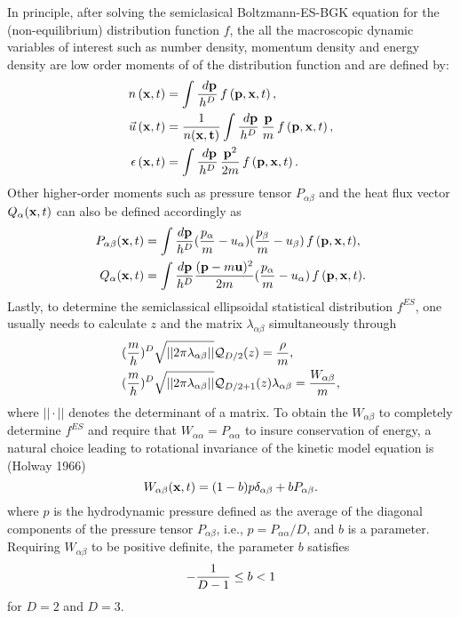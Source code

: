 \documentclass{rsproca}%
\begin{document}
In principle, after solving the semiclasical Boltzmann-ES-BGK equation for the (non-equilibrium) distribution function $f$, the all the macroscopic dynamic variables of interest such as number density, momentum density and energy density are low order moments of of the distribution function and are defined by:
\begin{subequations}
\begin{align}
n\left({\bf x},t\right) &= \int{\frac{\ d{\bf p}}{h^D}}\,f\left({\bf p},{\bf x}, t\right), \\
\vec u \left({\bf x},t\right) &= {1\over n(\bf x, t) }\int{\frac{\ d{\bf p}}{h^D}\,\frac{\bf p}{m}}\,f\left({\bf p},{\bf x}, t\right), \\
{\epsilon}\left({\bf x},t\right) &= \int{\frac{\ d{\bf p}}{h^D}\,\frac{{\bf p}^2}{2m}}\,f\left({\bf p},{\bf x}, t\right).
\end{align}
\end{subequations}
Other higher-order moments such as pressure tensor $P_{\alpha \beta}$ and the heat flux vector $Q_{\alpha}({\bf x},t)$ can also be defined accordingly as
\begin{align}
P_{\alpha \beta}({\bf x},t) &= \int{\frac{d{\bf p}}{h^D}(\frac{p_{\alpha}}{m}-u_{\alpha})(\frac{p_{\beta}}{m}-u_{\beta})\,f\,({\bf p},{\bf x},t)}, \\
Q_{\alpha}({\bf x},t) &= \int{\frac{d{\bf p}}{h^D}\frac{({\bf p}-m{\bf u})^2}{2m}(\frac{p_{\alpha}}{m}-u_{\alpha})\,f\,({\bf p},{\bf x},t)}.
\label{stressflux}
\end{align}
Lastly, to determine the semiclassical ellipsoidal statistical distribution $f^{ES}$, one usually needs to calculate $z$ and the matrix $\lambda_{\alpha \beta}$ simultaneously through
\begin{align}
&({m \over  h})^D \sqrt{ ||2 \pi \lambda_{\alpha \beta}|| } \mathcal{Q}_{D/2}(z)= {\rho \over m}, \\
&({m \over  h})^D \sqrt{ ||2 \pi \lambda_{\alpha \beta}|| } \mathcal{Q}_{D/2 +1}(z) \lambda_{\alpha \beta} = {W_{\alpha \beta} \over m},
\end{align}
where $||\cdot ||$ denotes the determinant of a matrix.   To obtain the $W_{\alpha \beta}$ to completely determine $f^{ES}$ and require that $W_{\alpha \alpha}=P_{\alpha \alpha}$ to insure conservation of energy, a natural choice leading to rotational invariance of the kinetic model equation is (Holway 1966)
\begin{equation}
W_{\alpha \beta}({\bf x},t) = (1 - b) p \delta_{\alpha \beta} + b P_{\alpha \beta}.
\end{equation}
where $p$ is the hydrodynamic pressure defined as the average of the diagonal components of the pressure tensor $P_{\alpha \beta}$, i.e., $p = P_{\alpha \alpha}/D$, and $b$ is a parameter.  Requiring $ W_{\alpha \beta}$ to be positive definite, the parameter $b$ satisfies
\begin{align}
-{ 1\over D-1} \le b < 1
\end{align}
for $D=2$ and $D=3$.
\end{document}
